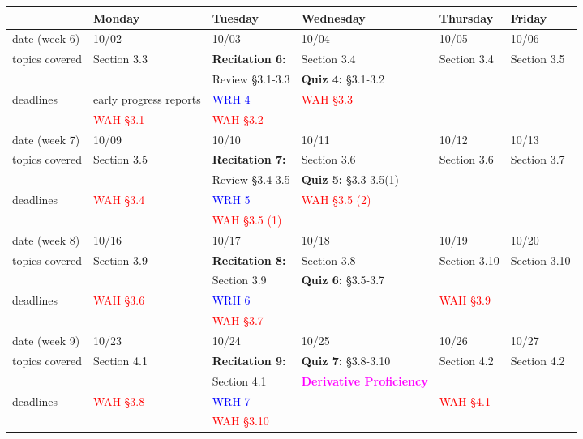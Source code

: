 \documentclass[11pt,fleqn]{article}
\begin{document}
\begin{tabularx}{\textwidth}{|X|| X | X | X | X | X |}
\hline
&Monday & Tuesday & Wednesday & Thursday & Friday \\
\hline \hline
\rowcolor{gray!20}
date (week 6)&10/02&10/03&10/04&10/05&10/06\\ \hline
topics covered&Section 3.3&\textbf{Recitation 6:}&Section 3.4&Section 3.4&Section 3.5\\ 
&&Review \S3.1-3.3&\textbf{Quiz 4:} \S 3.1-3.2&&\\ \hline
deadlines&\textcolor{ddgreen}{early progress reports}&\textcolor{blue}{WRH 4} &\textcolor{red}{WAH \S 3.3}&& \\ 
&\textcolor{red}{WAH \S 3.1}&\textcolor{red}{WAH \S 3.2}&&&\\ \hline \hline
\rowcolor{gray!20}
date (week 7)&10/09&10/10&10/11&10/12&10/13\\ \hline
topics covered&Section 3.5&\textbf{Recitation 7:}&Section 3.6&Section 3.6&Section 3.7\\ 
&&Review \S3.4-3.5&\textbf{Quiz 5:} \S 3.3-3.5(1)&&\\ \hline
deadlines&\textcolor{red}{WAH \S 3.4}&\textcolor{blue}{WRH 5} &\textcolor{red}{WAH \S 3.5 (2)}&& \\
&&\textcolor{red}{WAH \S 3.5 (1)}&&& \\ \hline \hline
\rowcolor{gray!20}
date (week 8)&10/16&10/17&10/18&10/19&10/20\\ \hline
topics covered&Section 3.9&\textbf{Recitation 8:}&Section 3.8&Section 3.10&Section 3.10\\ 
&&Section 3.9&\textbf{Quiz 6:} \S3.5-3.7&&\\ \hline
deadlines&\textcolor{red}{WAH \S 3.6}&\textcolor{blue}{WRH 6} &&\textcolor{red}{WAH \S 3.9}& \\
&&\textcolor{red}{WAH \S 3.7}&&&\\ \hline \hline
\rowcolor{gray!20}
date (week 9)&10/23&10/24&10/25&10/26&10/27\\ \hline
topics covered&Section 4.1&\textbf{Recitation 9:}&\textbf{Quiz 7:} \S3.8-3.10&Section 4.2&Section 4.2\\ 
&&Section 4.1&\textcolor{magenta}{\textbf{Derivative Proficiency}}&&\\ \hline
deadlines&\textcolor{red}{WAH \S 3.8}&\textcolor{blue}{WRH 7} &&\textcolor{red}{WAH \S 4.1}& \\ 
&&\textcolor{red}{WAH \S 3.10}&&&\\ \hline \hline

\end{tabularx}
\end{document}

